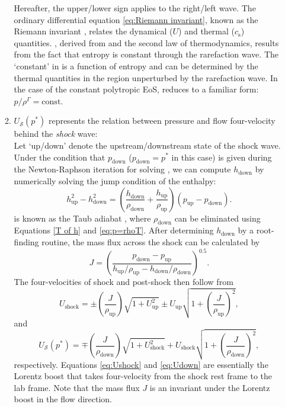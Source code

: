 \begin{enumerate}
\begin{enumerate}
          Hereafter, the upper/lower sign applies to the right/left wave. The ordinary differential equation \eqref{eq:Riemann invariant}, known as the Riemann invariant \citep{Rezzolla2018}, relates the dynamical ($U$) and thermal ($c_{\text{s}}$) quantities. , derived from  and the second law of thermodynamics, results from the fact that entropy is constant through the rarefaction wave. The `constant' in  is a function of entropy and can be determined by the thermal quantities in the region unperturbed by the rarefaction wave. In the case of the constant polytropic EoS,  reduces to a familiar form: $p/\rho^{\Gamma}=\text{const}$.

          \item $U_{\mathscr{S}}(p^*)$ represents the relation between pressure and flow four-velocity behind the \emph{shock} wave:\\
          Let `up/down' denote the upstream/downstream state of the shock wave. Under the condition that $p_{\text{down}}$ ($p_{\text{down}}=p^{*}$ in this case) is given during the Newton-Raphson iteration for solving , we can compute $h_{\text{down}}$ by numerically solving the jump condition of the enthalpy:
          \begin{equation}
          h^2_{\text{up}}-h^2_{\text{down}}=\left(\frac{h_{\text{down}}}{\rho_{\text{down}}}+\frac{h_{\text{up}}}{\rho_{\text{up}}}\right)\left(p_{\text{up}}-p_{\text{down}}\right).
          \label{eq:TaubAdiabatic}
          \end{equation}
           is known as the Taub adiabat \citep{Taub}, where $\rho_{\text{down}}$ can be eliminated using Equations \eqref{T of h} and \eqref{eq:p=rhoT}. After determining $h_{\text{down}}$ by a root-finding routine, the mass flux across the shock can be calculated by
          \begin{equation} J=\left(\frac{p_{\text{down}}-p_{\text{up}}}{h_{\text{up}}/\rho_{\text{up}}-h_{\text{down}}/\rho_{\text{down}}}\right)^{0.5}.
          \label{eq:mass flux}
          \end{equation}
          The four-velocities of shock and post-shock then follow from
          \begin{equation}
          U_{\text{shock}}=\pm \left(\frac{J}{\rho_{\text{up}}}\right)\sqrt{1+U^2_{\text{up}}}\pm U_{\text{up}}\sqrt{1+\left(\frac{J}{\rho_{\text{up}}}\right)^2},
          \label{eq:Ushock}
          \end{equation}
          and
          \begin{equation}
          U_{\mathscr{S}}(p^{*})=\mp \left(\frac{J}{\rho_{\text{down}}}\right)\sqrt{1+U^2_{\text{shock}}}+U_{\text{shock}}\sqrt{1+\left(\frac{J}{\rho_{\text{down}}}\right)^2},
          \label{eq:Udown}
          \end{equation}
          respectively. Equations \eqref{eq:Ushock} and \eqref{eq:Udown} are essentially the Lorentz boost that takes four-velocity from the shock rest frame to the lab frame. Note that the mass flux $J$ is an invariant under the Lorentz boost in the flow direction.
          \end{enumerate}


\end{enumerate}
